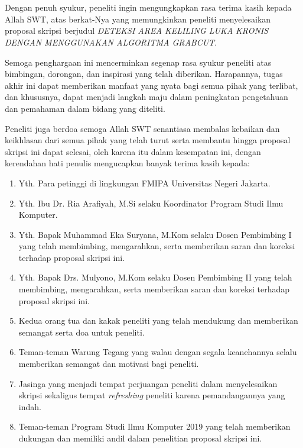 \chapter*{}
\onehalfspacing{}
Dengan penuh syukur, peneliti ingin mengungkapkan rasa terima kasih kepada Allah SWT, 
atas berkat-Nya yang memungkinkan peneliti menyelesaikan proposal skripsi berjudul 
\textit{DETEKSI AREA KELILING LUKA KRONIS DENGAN MENGGUNAKAN ALGORITMA GRABCUT}.

Semoga penghargaan ini mencerminkan segenap rasa syukur peneliti atas bimbingan, 
dorongan, dan inspirasi yang telah diberikan. Harapannya, tugas akhir ini dapat 
memberikan manfaat yang nyata bagi semua pihak yang terlibat, dan khususnya, dapat 
menjadi langkah maju dalam peningkatan pengetahuan dan pemahaman dalam bidang yang 
diteliti. 

Peneliti juga berdoa semoga Allah SWT senantiasa membalas kebaikan dan 
keikhlasan dari semua pihak yang telah turut serta membantu hingga proposal skripsi
ini dapat selesai, oleh karena itu dalam kesempatan ini, dengan kerendahan hati 
penulis mengucapkan banyak terima kasih kepada:

\begin{enumerate}

	\item{Yth. Para petinggi di lingkungan FMIPA Universitas Negeri Jakarta.}
	\item{Yth. Ibu Dr. Ria Arafiyah, M.Si selaku Koordinator Program Studi Ilmu
		Komputer.}
	\item{Yth. Bapak Muhammad Eka Suryana, M.Kom selaku Dosen Pembimbing I yang
		telah membimbing, mengarahkan, serta memberikan saran dan koreksi terhadap
		proposal skripsi ini.}
	\item{Yth. Bapak Drs. Mulyono, M.Kom selaku Dosen Pembimbing II yang telah
		membimbing, mengarahkan, serta memberikan saran dan koreksi terhadap
		proposal skripsi ini.}
	\item{Kedua orang tua dan kakak peneliti yang telah mendukung dan memberikan 
		semangat serta doa untuk peneliti.}
	\item{Teman-teman Warung Tegang yang walau dengan segala keanehannya selalu
		memberikan semangat dan motivasi bagi peneliti.}
	\item{Jasinga yang menjadi tempat perjuangan peneliti dalam menyelesaikan skripsi 
		sekaligus tempat \emph{refreshing} peneliti karena pemandangannya yang indah.}
	\item{Teman-teman Program Studi Ilmu Komputer 2019 yang telah memberikan 
		dukungan dan memiliki andil dalam penelitian proposal skripsi ini.}
	
\end{enumerate}

